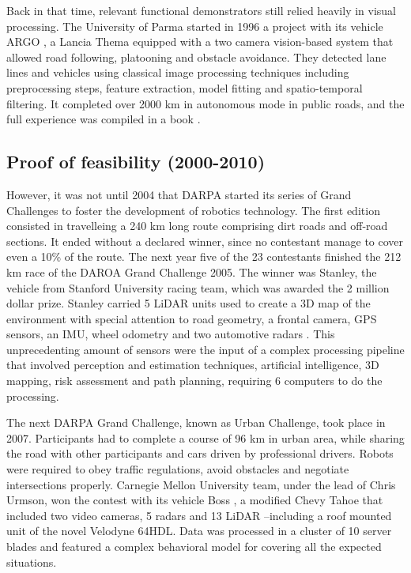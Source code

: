 Back in that time, relevant functional demonstrators still relied
heavily in visual processing. The University of Parma started in 1996 a
project with its vehicle ARGO \cite{Broggi1998}, a Lancia Thema equipped with 
a two camera vision-based system that allowed road following, platooning and 
obstacle avoidance. They detected lane lines and vehicles using classical image 
processing techniques including preprocessing steps, feature extraction,
model fitting and spatio-temporal filtering.
It completed over 2000 km in autonomous mode in public roads, and the 
full experience was compiled in a book \cite{Broggi1999}.


\subsection{Proof of feasibility (2000-2010)}

However, it was not until 2004 that DARPA started its series of Grand Challenges
to foster the development of robotics technology. 
The first edition consisted in travelleing a 240 km long route comprising dirt 
roads and off-road sections. It ended without a declared winner, since no 
contestant manage to cover even a 10\% of the route.
The next year five of the 23 contestants finished the 212 km race of the 
DAROA Grand Challenge 2005. 
The winner was Stanley, the vehicle from Stanford University racing team, which 
was awarded the 2 million dollar prize.
Stanley carried 5 LiDAR units used to create a 3D map of the environment with 
special attention to road geometry, a frontal camera, GPS sensors, an IMU, 
wheel odometry and two automotive radars \cite{Thrun2006}. This unprecedenting
amount of sensors were the input of a complex processing pipeline that involved 
perception and estimation techniques, artificial intelligence, 3D mapping, risk 
assessment and path planning, requiring 6 computers to do the processing.

The next DARPA Grand Challenge, known as Urban Challenge, took place in 2007.
Participants had to complete a course of 96 km in urban area, while sharing the
road with other participants and cars driven by professional drivers. Robots
were required to obey traffic regulations, avoid obstacles and negotiate 
intersections properly. Carnegie Mellon University team, under the lead of
Chris Urmson, won the contest with 
its vehicle Boss \cite{TartanRacing2005}, a 
modified Chevy Tahoe that included two video cameras, 
5 radars and 13 LiDAR --including a roof mounted unit of the novel Velodyne
64HDL. Data was processed in a cluster of 10 server blades and featured
a complex behavioral model \cite{Urmson2007} for covering all the expected
situations.

